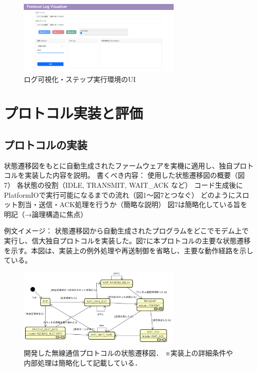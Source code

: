 \documentclass[paper]{ieicej}
\begin{document}
  \begin{figure}[tb]
    \centering
    \includegraphics[width=80mm]{./images/viewer_ui.png}
    \caption{ログ可視化・ステップ実行環境のUI}
    \label{fig:viewer-ui}
  \end{figure}


\section{プロトコル実装と評価}

\subsection{プロトコルの実装}
状態遷移図をもとに自動生成されたファームウェアを実機に適用し、独自プロトコルを実装した内容を説明。
書くべき内容：
使用した状態遷移図の概要（図7）
各状態の役割（IDLE, TRANSMIT, WAIT\_ACK など）
コード生成後にPlatformIOで実行可能になるまでの流れ（図1〜図7とつなぐ）
どのようにスロット割当・送信・ACK処理を行うか（簡略な説明）
図7は簡略化している旨を明記（→論理構造に焦点）

例文イメージ：
状態遷移図から自動生成されたプログラムをどこでモデム上で実行し、信大独自プロトコルを実装した。図7に本プロトコルの主要な状態遷移を示す。本図は、実装上の例外処理や再送制御を省略し、主要な動作経路を示している。
\begin{figure}[b]
  \centering
  \includegraphics[width=80mm]{./images/protocol-state-machine3.png}
  \caption{開発した無線通信プロトコルの状態遷移図．
※実装上の詳細条件や内部処理は簡略化して記載している．}
  \label{fig:protocol-state-machine}
\end{figure}
\end{document}
